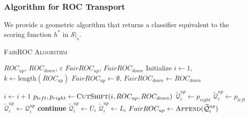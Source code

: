 \documentclass{article}
\begin{document}
\subsubsection{Algorithm for ROC Transport}
We provide a geometric algorithm that returns a classifier equivalent to the scoring function $h^*$ in $\mathcal{S}|_s$.%


\begin{algorithm}
\caption{\textsc{FairROC Algorithm}}
\label{alg:fairroc}
\begin{algorithmic}[1]
\Require $ROC_{up}$, $ROC_{down}$, $\varepsilon$
\Ensure $FairROC_{up}$, $FairROC_{down}$
\State Initialize $i \gets 1$, $k \gets \text{length}(ROC_{up})$
\State $FairROC_{up} \gets \emptyset$, $FairROC_{down} \gets ROC_{down}$

    \State $i \gets i+1$
        \State $p_{left}, p_{right} \gets \Call{CutShift}{i, ROC_{up}, ROC_{down}}$
            \State $\widetilde{\mathcal{Q}}_i^{up} \gets p_{right}$
        \Else
            \State $\widetilde{\mathcal{Q}}_i^{up} \gets p_{left}$
        \EndIf
        \State $\widetilde{\mathcal{Q}}_i^{up} \gets \mathcal{Q}_i^{up}$
        \State \textbf{continue}
    \Else
            \State $\widetilde{\mathcal{Q}}_i^{up} \gets U_i$
        \Else
            \State $\widetilde{\mathcal{Q}}_i^{up} \gets L_i$
        \EndIf
    \EndIf
    \State $FairROC_{up} \gets \Call{Append}{\widetilde{\mathcal{Q}}_i^{up}}$
\EndWhile

\end{algorithmic}
\end{algorithm}




\end{document}
